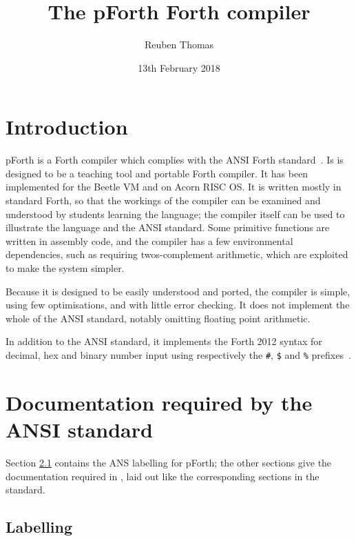 \documentclass[english]{article}
\begin{document}
\title{The pForth Forth compiler}
\author{Reuben Thomas}
\date{13th February 2018}
\maketitle


\section{Introduction}

pForth is a Forth compiler which complies with the ANSI Forth standard~\cite{ANSIforth}. Is is designed to be a teaching tool and portable Forth compiler. It has been implemented for the Beetle VM and on Acorn RISC OS. It is written mostly in standard Forth, so that the workings of the compiler can be examined and understood by students learning the language; the compiler itself can be used to illustrate the language and the ANSI standard. Some primitive functions are written in assembly code, and the compiler has a few environmental dependencies, such as requiring twos-complement arithmetic, which are exploited to make the system simpler.

Because it is designed to be easily understood and ported, the compiler is
simple, using few optimisations, and with little error checking. It does not
implement the whole of the ANSI standard, notably omitting floating point arithmetic.

In addition to the ANSI standard, it implements the Forth 2012 syntax for decimal, hex and binary number input using respectively the {\tt \#}, {\tt \$} and {\tt \%} prefixes~\cite[section 3.4.1.3 “Text interpreter input number conversion”]{forth2012}.


\section{Documentation required by the ANSI standard}

Section \ref{labelling} contains the ANS labelling for pForth; the other
sections give the documentation required in \cite[section 4.1]{ANSIforth},
laid out like the corresponding sections in the standard.


\subsection{Labelling}
\label{labelling}
\end{document}
